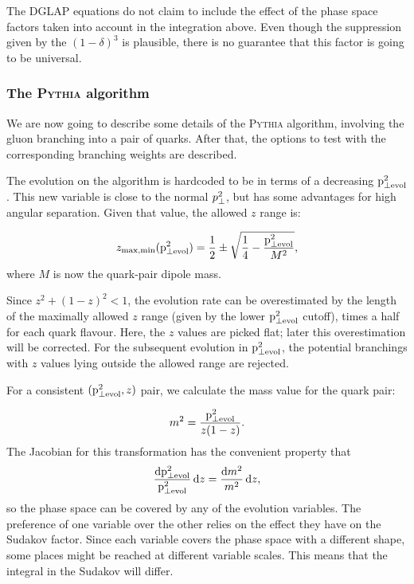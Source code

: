 \documentclass[a4paper,12pt]{article}
\begin{document}
The DGLAP equations do not claim to include the effect of the phase space factors taken into account in the integration above. Even though the suppression given by the $(1-\delta)^3$ is plausible, there is no guarantee that this factor is going to be universal.

\subsubsection{The \textsc{Pythia} algorithm}
\label{subsubsec:PythiaAlg}

We are now going to describe some details of the \textsc{Pythia} algorithm, involving the gluon branching into a pair of quarks. After that, the options to test with the corresponding branching weights are described.

The evolution on the algorithm is hardcoded to be in terms of a decreasing ${\mathrm p}^2_{\perp\mathrm{evol}}$. This new variable is close to the normal $p^2_{\perp}$, but has some advantages for high angular separation. Given that value, the allowed $z$ range is:

\begin{equation}
z_{\mathrm{max,min}}({\mathrm p}^2_{\perp\mathrm{evol}}) = \frac{1}{2} \pm \sqrt{ \frac{1}{4}
 - \frac{{\mathrm p}^2_{\perp\mathrm{evol}}}{M^2}},
\end{equation}
where $M$ is now the quark-pair dipole mass.

Since $z^2 + (1 - z)^2 < 1$, the evolution rate can be overestimated by the length of the maximally allowed $z$ range (given by the lower ${\mathrm p}^2_{\perp\mathrm{evol}}$ cutoff), times a half for each quark flavour. Here, the $z$ values are picked flat; later this overestimation will be corrected. For the subsequent evolution in ${\mathrm p}^2_{\perp\mathrm{evol}}$, the potential branchings with $z$ values lying outside the allowed range are rejected.

For a consistent $({\mathrm p}^2_{\perp\mathrm{evol}},z)$ pair, we calculate the mass value for the quark pair:

\begin{equation}
m^2 = \frac{{\mathrm p}^2_{\perp\mathrm{evol}}}{z(1-z)}.
\end{equation}
The Jacobian for this transformation has the convenient property that
\begin{equation}
\frac{{\mathrm d}{\mathrm p}^2_{\perp\mathrm{evol}}}{{\mathrm p}^2_{\perp\mathrm{evol}}} \, {\mathrm d} z = \frac{{\mathrm d} m^2}{m^2} \, {\mathrm d} z,
\label{jacobian}
\end{equation}
so the phase space can be covered by any of the evolution variables. The preference of one variable over the other relies on the effect they have on the Sudakov factor. Since each variable covers the phase space with a different shape, some places might be reached at different variable scales. This means that the integral in the Sudakov will differ.
\end{document}
